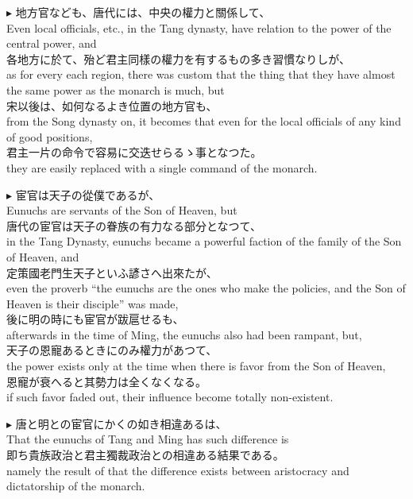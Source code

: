 \documentclass{ctexart}
\makeatletter
\newcommand*{\shifttext}[1]{%
  \settowidth{\@tempdima}{#1}%
  \hspace{-\@tempdima}#1%
}
\newcommand{\plabel}[1]{%
\shifttext{\textbf{#1}\quad}%
}
\makeatother
\begin{document}
\vspace{1em}
\plabel{$\blacktriangleright$}%
地方官なども、唐代には、中央の權力と關係して、\\
Even local officials, etc., in the Tang dynasty, have relation to the power of the central power, and\\
各地方に於て、殆ど君主同樣の權力を有するもの多き習慣なりしが、\\
as for every each region, there was custom that the thing that they have almost the same power as the monarch is much, but\\
宋以後は、如何なるよき位置の地方官も、\\
from the Song dynasty on, it becomes that even for the local officials of any kind of good positions,\\
君主一片の命令で容易に交迭せらるゝ事となつた。\\
they are easily replaced with a single command of the monarch.

\vspace{1em}
\plabel{$\blacktriangleright$}%
宦官は天子の從僕であるが、\\
Eunuchs are servants of the Son of Heaven, but\\
唐代の宦官は天子の眷族の有力なる部分となつて、\\
in the Tang Dynasty, eunuchs became a powerful faction of the family of the Son of Heaven, and\\
定策國老門生天子といふ諺さへ出來たが、\\
even the proverb ``the eunuchs are the ones who make the policies, and the Son of Heaven is their disciple'' was made,\\
後に明の時にも宦官が跋扈せるも、\\
afterwards in the time of Ming, the eunuchs also had been rampant, but,\\
天子の恩寵あるときにのみ權力があつて、\\
the power exists only at the time when there is favor from the Son of Heaven,\\
恩寵が衰へると其勢力は全くなくなる。\\
if such favor faded out, their influence become totally non-existent.

\vspace{1em}
\plabel{$\blacktriangleright$}%
唐と明との宦官にかくの如き相違あるは、\\
That the eunuchs of Tang and Ming has such difference is\\
即ち貴族政治と君主獨裁政治との相違ある結果である。\\
namely the result of that the difference exists between aristocracy and dictatorship of the monarch.
\end{document}
